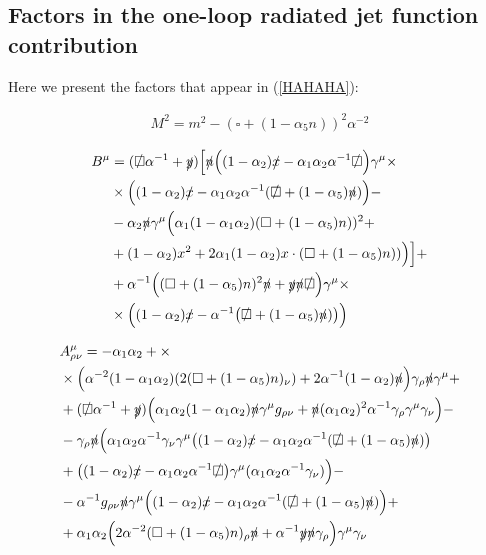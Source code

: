 \documentclass[%
 reprint,
 amsmath,amssymb,
 aps,
]{revtex4-1}
\begin{document}
\subsection{Factors in the one-loop radiated jet function contribution}
Here we present the factors that appear in (\ref{HAHAHA}):

\begin{align}
M^2=m^2-(\square+(1-\alpha_5 n))^2\alpha^{-2}
\end{align}

\begin{align}
B^\mu&=(\slashed\square\alpha^{-1}+\slashed y)\Big[\slashed n\Big((1-\alpha_2)\slashed x-\alpha_1\alpha_2\alpha^{-1}\slashed\square\Big)\gamma^\mu\times\nonumber\\
&\times\Big((1-\alpha_2)\slashed x-\alpha_1\alpha_2\alpha^{-1}(\slashed\square+(1-\alpha_5)\slashed n)\Big)-\nonumber\\
&-\alpha_2\slashed n \gamma^\mu\Big(\alpha_1(1-\alpha_1\alpha_2)(\square+(1-\alpha_5) n))^2+\nonumber\\
&+(1-\alpha_2)x^2+2\alpha_1(1-\alpha_2)x\cdot(\square+(1-\alpha_5) n))\Big)\Big]+\nonumber\\
&+\alpha^{-1}\Big((\square+(1-\alpha_5)n)^2\slashed n+\slashed y\slashed n\slashed\square\Big)\gamma^\mu\times\nonumber\\
&\times\Big((1-\alpha_2)\slashed x-\alpha^{-1}\big(\slashed\square+(1-\alpha_5) \slashed n)\big)\Big)
\end{align}

\begin{align}
&A_{\rho\nu}^\mu=- \alpha_1\alpha_2+\times\nonumber\\
&\times\Big(\alpha^{-2}(1-\alpha_1\alpha_2)(2(\square+(1-\alpha_5)n)_\nu)+2\alpha^{-1}(1-\alpha_2)\slashed n\Big)\gamma_\rho\slashed n\gamma^\mu+\nonumber\\
&+(\slashed\square\alpha^{-1}+\slashed y)\Big(\alpha_1\alpha_2(1-\alpha_1\alpha_2)\slashed n \gamma^\mu g_{\rho\nu}+\slashed n(\alpha_1\alpha_2)^2\alpha^{-1}\gamma_\rho\gamma^\mu\gamma_\nu\Big)-\nonumber\\
&-\gamma_\rho\slashed n\Big(\alpha_1\alpha_2\alpha^{-1}\gamma_\nu\gamma^\mu\big((1-\alpha_2)\slashed x-\alpha_1\alpha_2\alpha^{-1}(\slashed\square+(1-\alpha_5)\slashed n)\big)\nonumber\\
&+\big((1-\alpha_2)\slashed x-\alpha_1\alpha_2\alpha^{-1}\slashed\square\big)\gamma^\mu(\alpha_1\alpha_2\alpha^{-1}\gamma_\nu)\Big)-\nonumber\\
&-\alpha^{-1}g_{\rho\nu}\slashed n\gamma^\mu\Big((1-\alpha_2)\slashed x-\alpha_1\alpha_2\alpha^{-1}(\slashed\square+(1-\alpha_5)\slashed n)\Big)+\nonumber\\
&+\alpha_1\alpha_2\Big(2\alpha^{-2}(\square+(1-\alpha_5) n)_\rho\slashed n+\alpha^{-1}\slashed y\slashed n\gamma_\rho\Big)\gamma^\mu\gamma_\nu
\end{align}
\end{document}
